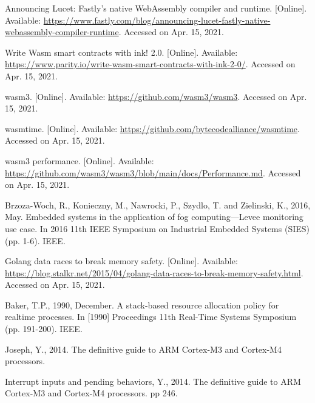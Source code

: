 \documentclass{ieeeaccess}
\begin{document}
\begin{thebibliography}{00}
 Announcing Lucet: Fastly’s native WebAssembly compiler and runtime. [Online]. Available: \url{https://www.fastly.com/blog/announcing-lucet-fastly-native-webassembly-compiler-runtime}. Accessed on Apr. 15, 2021.

 Write Wasm smart contracts with ink! 2.0. [Online]. Available: \url{https://www.parity.io/write-wasm-smart-contracts-with-ink-2-0/}. Accessed on Apr. 15, 2021.

 wasm3. [Online]. Available: \url{https://github.com/wasm3/wasm3}. Accessed on Apr. 15, 2021.

 wasmtime. [Online]. Available: \url{https://github.com/bytecodealliance/wasmtime}. Accessed on Apr. 15, 2021.

 wasm3 performance. [Online]. Available: \url{https://github.com/wasm3/wasm3/blob/main/docs/Performance.md}. Accessed on Apr. 15, 2021.

 Brzoza-Woch, R., Konieczny, M., Nawrocki, P., Szydlo, T. and Zielinski, K., 2016, May. Embedded systems in the application of fog computing—Levee monitoring use case. In 2016 11th IEEE Symposium on Industrial Embedded Systems (SIES) (pp. 1-6). IEEE.

 Golang data races to break memory safety. [Online]. Available: \url{https://blog.stalkr.net/2015/04/golang-data-races-to-break-memory-safety.html}. Accessed on Apr. 15, 2021.

 Baker, T.P., 1990, December. A stack-based resource allocation policy for realtime processes. In [1990] Proceedings 11th Real-Time Systems Symposium (pp. 191-200). IEEE.

 Joseph, Y., 2014. The definitive guide to ARM Cortex-M3 and Cortex-M4 processors.

 Interrupt inputs and pending behaviors, Y., 2014. The definitive guide to ARM Cortex-M3 and Cortex-M4 processors. pp 246.

\end{thebibliography}

\EOD
\end{document}
